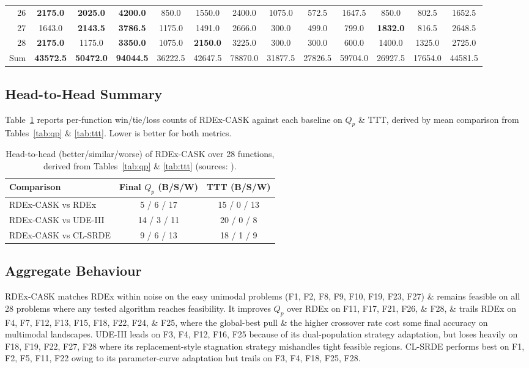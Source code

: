 \documentclass[conference]{IEEEtran}
\begin{document}
\begin{table}[!t]
\begin{tabular}{r ccc ccc ccc ccc}
26 & \textbf{2175.0} & \textbf{2025.0} & \textbf{4200.0} & 850.0 & 1550.0 & 2400.0 & 1075.0 & 572.5 & 1647.5 & 850.0 & 802.5 & 1652.5 \\
27 & 1643.0 & \textbf{2143.5} & \textbf{3786.5} & 1175.0 & 1491.0 & 2666.0 & 300.0 & 499.0 & 799.0 & \textbf{1832.0} & 816.5 & 2648.5 \\
28 & \textbf{2175.0} & 1175.0 & \textbf{3350.0} & 1075.0 & \textbf{2150.0} & 3225.0 & 300.0 & 300.0 & 600.0 & 1400.0 & 1325.0 & 2725.0 \\
\midrule
Sum & \textbf{43572.5} & \textbf{50472.0} & \textbf{94044.5} & 36222.5 & 42647.5 & 78870.0 & 31877.5 & 27826.5 & 59704.0 & 26927.5 & 17654.0 & 44581.5 \\
\bottomrule
\end{tabular}
\end{table}

\subsection{Head-to-Head Summary}
Table~\ref{tab:h2h} reports per-function win/tie/loss counts of RDEx-CASK against each baseline on $Q_p$ \& TTT, derived by mean comparison from Tables~\ref{tab:qp} \& \ref{tab:ttt}. Lower is better for both metrics.

\begin{table}[!t]
\centering
\caption{Head-to-head (better/similar/worse) of RDEx-CASK over 28 functions, derived from Tables~\ref{tab:qp} \& \ref{tab:ttt} (sources: \cite{cask_results, tao2026rdex}).}
\label{tab:h2h}
\footnotesize
\setlength{\tabcolsep}{6pt}
\begin{tabular}{lcc}
\toprule
Comparison & Final $Q_p$ (B/S/W) & TTT (B/S/W) \\
\midrule
RDEx-CASK vs RDEx     & 5 / 6 / 17 & 15 / 0 / 13 \\
RDEx-CASK vs UDE-III  & 14 / 3 / 11 & 20 / 0 / 8 \\
RDEx-CASK vs CL-SRDE  & 9 / 6 / 13 & 18 / 1 / 9 \\
\bottomrule
\end{tabular}
\end{table}

\subsection{Aggregate Behaviour}
RDEx-CASK matches RDEx within noise on the easy unimodal problems (F1, F2, F8, F9, F10, F19, F23, F27) \& remains feasible on all 28 problems where any tested algorithm reaches feasibility. It improves $Q_p$ over RDEx on F11, F17, F21, F26, \& F28, \& trails RDEx on F4, F7, F12, F13, F15, F18, F22, F24, \& F25, where the global-best pull \& the higher crossover rate cost some final accuracy on multimodal landscapes. UDE-III leads on F3, F4, F12, F16, F25 because of its dual-population strategy adaptation, but loses heavily on F18, F19, F22, F27, F28 where its replacement-style stagnation strategy mishandles tight feasible regions. CL-SRDE performs best on F1, F2, F5, F11, F22 owing to its parameter-curve adaptation but trails on F3, F4, F18, F25, F28.
\end{document}
